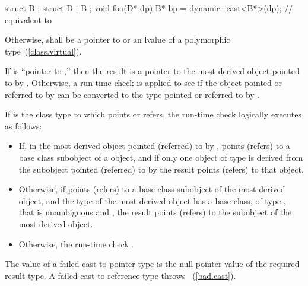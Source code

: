 \begin{codeblock}
struct B { };
struct D : B { };
void foo(D* dp) {
  B*  bp = dynamic_cast<B*>(dp);    // equivalent to 
}
\end{codeblock}
\exitexample 

\pnum
Otherwise,  shall be a pointer to or an lvalue of a polymorphic
type~(\ref{class.virtual}).

\pnum
If  is ``pointer to  ,'' then the result
is a pointer to the most derived object pointed to by .
Otherwise, a run-time check is applied to see if the object pointed or
referred to by  can be converted to the type pointed or
referred to by .

\pnum
If  is the class type to which  points or refers, the run-time
check logically executes as follows:

\begin{itemize}
\item If, in the most derived object pointed (referred) to by ,
 points (refers) to a  base class subobject of a
 object, and if only one object of type  is derived
from the subobject pointed (referred) to by  the result points (refers) to that  object.

\item Otherwise, if  points (refers) to a  base
class subobject of the most derived object, and the type of the most
derived object has a base class, of type , that is unambiguous
and , the result points (refers) to the
 subobject of the most derived object.

\item Otherwise, the
run-time check .
\end{itemize}

\pnum
The value of a failed cast to pointer type is the null pointer value of
the required result type. A failed cast to reference type throws
~(\ref{bad.cast}).

%
%
\enterexample 

